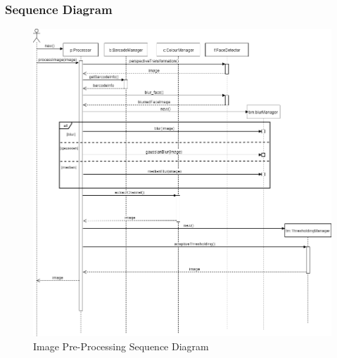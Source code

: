 \documentclass{article}
\begin{document}
\subsubsection{Sequence Diagram}
\begin{figure}[H]
	    \centering
	    \includegraphics[scale=0.5]{img/image_processing_sequence.png}
	    \caption{Image Pre-Processing Sequence Diagram}
	 \end{figure}
\end{document}
